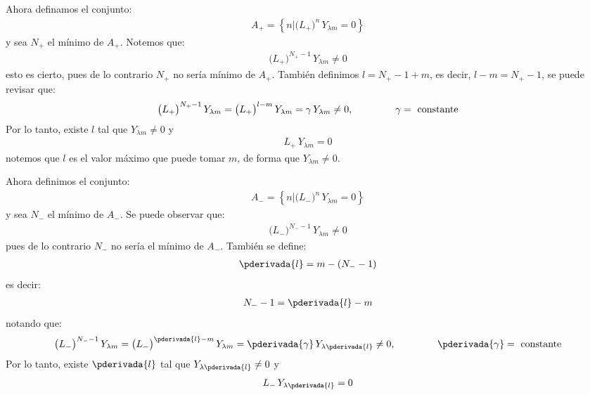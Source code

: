 Ahora definamos el conjunto:
\begin{align}
A_{+} = \left\{ n | \big( L_{+} \big)^{n}  \, Y_{\lambda m } = 0\right\}
\label{eq:ecuacion_10_144}
\end{align}
y sea $N_{+}$ el mínimo de $A_{+}$. Notemos que:
\begin{align}
\big( L_{+} \big)^{N_{+}-1} \, Y_{\lambda m} \neq 0
\label{eq:ecuacion_10_145}
\end{align}
esto es cierto, pues de lo contrario $N_{+}$ no sería mínimo de $A_{+}$. También definimos $l = N_{+} - 1 + m$, es decir, $l - m = N_{+} - 1$, se puede revisar que:
\begin{align*}
\big( L_{+} \big)^{N_{+}-1} \, Y_{\lambda m} = \big( L_{+} \big)^{l-m} \, Y_{\lambda m} = \gamma \, Y_{\lambda m} \neq 0, \hspace{1.5cm} \gamma = \mbox{ constante}
\end{align*}
Por lo tanto, existe $l$ tal que $Y_{\lambda m} \neq 0$ y
\begin{align*}
L_{+} \, Y_{\lambda m} = 0
\end{align*}
notemos que $l$ es el valor máximo que puede tomar $m$, de forma que $Y_{\lambda m} \neq 0$.
\par
Ahora definimos el conjunto:
\begin{align}
A_{-} = \left\{ n | \big( L_{-} \big)^{n}  \, Y_{\lambda m } = 0 \right\}
\label{eq:ecuacion_10_146}
\end{align}
y sea $N_{-}$ el mínimo de $A_{-}$. Se puede observar que:
\begin{align}
\big( L_{-} \big)^{N_{-}-1}  \, Y_{\lambda m } \neq 0
\end{align}
pues de lo contrario $N_{-}$ no sería el mínimo de $A_{-}$. También se define:
\begin{align}
\pderivada{l} = m - (N_{-} - 1)
\end{align}
es decir:
\begin{align}
N_{-} - 1 = \pderivada{l} - m
\end{align}
notando que:
\begin{align*}
\big( L_{-} \big)^{N_{-}-1} \, Y_{\lambda m} = \big( L_{-} \big)^{\pderivada{l}-m} \, Y_{\lambda m} = \pderivada{\gamma} \, Y_{\lambda \pderivada{l}} \neq 0, \hspace{1.5cm} \pderivada{\gamma} = \mbox{ constante}
\end{align*}
Por lo tanto, existe $\pderivada{l}$ tal que $Y_{\lambda \pderivada{l}} \neq 0$ y
\begin{align*}
L_{-} \, Y_{\lambda \pderivada{l}} = 0
\end{align*}
